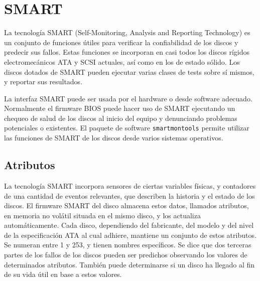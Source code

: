 \section{SMART}

La tecnología SMART (Self-Monitoring, Analysis and Reporting Technology) es un conjunto de funciones útiles para verificar la confiabilidad de los discos y predecir sus fallos. Estas funciones se incorporan en casi todos los discos rígidos electromecánicos ATA y SCSI actuales, así como en los de estado sólido. Los discos dotados de SMART pueden ejecutar varias clases de tests sobre sí mismos, y reportar sus resultados.

La interfaz SMART puede ser usada por el hardware o desde software adecuado. Normalmente el firmware BIOS puede hacer uso de SMART ejecutando un chequeo de salud de los discos al inicio del equipo y denunciando problemas potenciales o existentes. El paquete de software \lstinline{smartmontools} permite utilizar las funciones de SMART de los discos desde varios sistemas operativos.

\subsection{Atributos}
La tecnología SMART incorpora sensores de ciertas variables físicas, y contadores de una cantidad de eventos relevantes, que describen la historia y el estado de los discos. El firmware SMART del disco almacena estos datos, llamados atributos, en memoria no volátil situada en el mismo disco, y los actualiza automáticamente. Cada disco, dependiendo del fabricante, del modelo y del nivel de la especificación ATA al cual adhiere, mantiene un conjunto de estos atributos. Se numeran entre 1 y 253, y tienen nombres específicos. Se dice que dos terceras partes de los fallos de los discos pueden ser predichos observando los valores de determinados atributos. También puede determinarse si un disco ha llegado al fin de su vida útil en base a estos valores.

